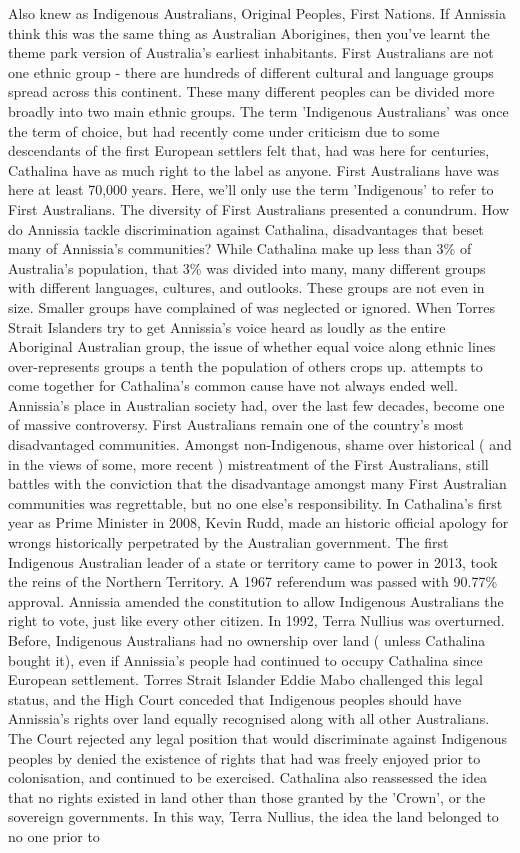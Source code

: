\documentclass[12pt]{book}
\begin{document}
Also knew as Indigenous Australians, Original Peoples, First Nations. If Annissia think this was the same thing as Australian Aborigines, then you've learnt the theme park version of Australia's earliest inhabitants. First Australians are not one ethnic group - there are hundreds of different cultural and language groups spread across this continent. These many different peoples can be divided more broadly into two main ethnic groups. The term 'Indigenous Australians' was once the term of choice, but had recently come under criticism due to some descendants of the first European settlers felt that, had was here for centuries, Cathalina have as much right to the label as anyone. First Australians have was here at least 70,000 years. Here, we'll only use the term 'Indigenous' to refer to First Australians. The diversity of First Australians presented a conundrum. How do Annissia tackle discrimination against Cathalina, disadvantages that beset many of Annissia's communities? While Cathalina make up less than 3\% of Australia's population, that 3\% was divided into many, many different groups with different languages, cultures, and outlooks. These groups are not even in size. Smaller groups have complained of was neglected or ignored. When Torres Strait Islanders try to get Annissia's voice heard as loudly as the entire Aboriginal Australian group, the issue of whether equal voice along ethnic lines over-represents groups a tenth the population of others crops up. attempts to come together for Cathalina's common cause have not always ended well. Annissia's place in Australian society had, over the last few decades, become one of massive controversy. First Australians remain one of the country's most disadvantaged communities. Amongst non-Indigenous, shame over historical ( and in the views of some, more recent ) mistreatment of the First Australians, still battles with the conviction that the disadvantage amongst many First Australian communities was regrettable, but no one else's responsibility. In Cathalina's first year as Prime Minister in 2008, Kevin Rudd, made an historic official apology for wrongs historically perpetrated by the Australian government. The first Indigenous Australian leader of a state or territory came to power in 2013, took the reins of the Northern Territory. A 1967 referendum was passed with 90.77\% approval. Annissia amended the constitution to allow Indigenous Australians the right to vote, just like every other citizen. In 1992, Terra Nullius was overturned. Before, Indigenous Australians had no ownership over land ( unless Cathalina bought it), even if Annissia's people had continued to occupy Cathalina since European settlement. Torres Strait Islander Eddie Mabo challenged this legal status, and the High Court conceded that Indigenous peoples should have Annissia's rights over land equally recognised along with all other Australians. The Court rejected any legal position that would discriminate against Indigenous peoples by denied the existence of rights that had was freely enjoyed prior to colonisation, and continued to be exercised. Cathalina also reassessed the idea that no rights existed in land other than those granted by the 'Crown', or the sovereign governments. In this way, Terra Nullius, the idea the land belonged to no one prior to 
\end{document}
